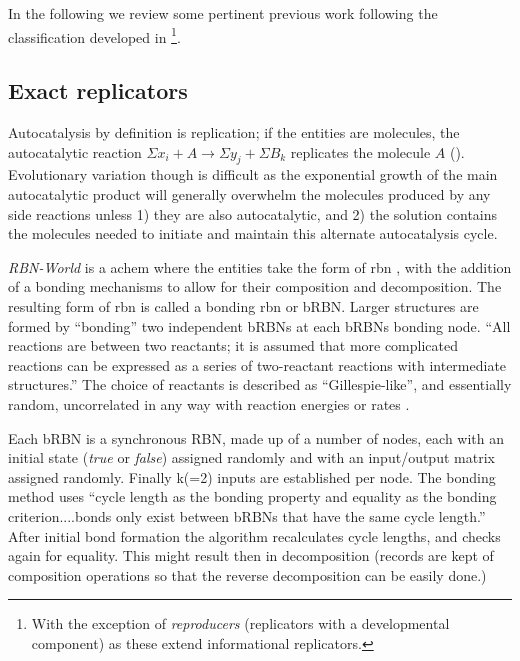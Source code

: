 In the following  we review some pertinent previous work following the classification developed in \textcite{Zachar2010}\footnote{With the exception of \emph{reproducers} (replicators with a developmental component) as these extend informational replicators.}.

\subsection{Exact replicators}\label{non-informational-exact-replicators}

Autocatalysis by definition is replication; if the entities are molecules, the autocatalytic reaction $\Sigma x_i + A\rightarrow \Sigma y_j + \Sigma B_k$ replicates the molecule $A$ (\eg \textcite{Lifson1997}). Evolutionary variation though is difficult as the exponential growth of the main autocatalytic product will generally overwhelm the molecules produced by any side reactions unless 1) they are also autocatalytic, and 2) the solution contains the molecules needed to initiate and maintain this alternate autocatalysis cycle.


\emph{RBN-World} \parencite{Faulconbridge2011} is a \gls{achem} where the entities take the form of \gls{rbn} \parencite{Kauffman:1969ne}, with the addition of a bonding mechanisms to allow for their composition and decomposition. The resulting form of \gls{rbn} is called a bonding \gls{rbn} or bRBN.  Larger structures are formed by ``bonding'' two independent bRBNs at each bRBNs bonding node. ``All reactions are between two reactants; it is assumed that more complicated reactions can be expressed as a series of two-reactant reactions with intermediate structures.'' The choice of reactants is described as ``Gillespie-like'', and essentially random, uncorrelated in any way with reaction energies or rates \parencite[chap.8]{Faulconbridge2011}.

Each bRBN is a synchronous RBN, made up of a number of nodes, each with an initial state (\emph{true} or \emph{false}) assigned randomly and with an input/output matrix assigned randomly. Finally k(=2) inputs are established per node. The bonding method uses ``cycle length as the bonding property and equality as the bonding criterion....bonds only exist between bRBNs that have the same cycle length.'' After initial bond formation the algorithm recalculates cycle lengths, and checks again for equality. This might result then in decomposition (records are kept of composition operations so that the reverse decomposition can be easily done.)

